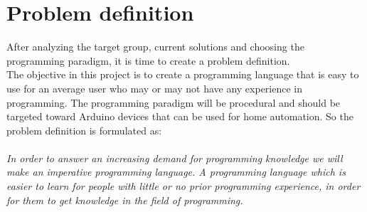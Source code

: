 \section{Problem definition}
After analyzing the target group, current solutions and choosing the programming paradigm, it is time to create a problem definition. \\ The objective in this project is to create a programming language that is easy to use for an average user who may or may not have any experience in programming. The programming paradigm will be procedural and should be targeted toward Arduino devices that can be used for home automation. So the problem definition is formulated as:\\
\\
\textit{In order to answer an increasing demand for programming knowledge we will make an imperative programming language. A programming language which is easier to learn for people with little or no prior programming experience, in order for them to get knowledge in the field of programming.}


